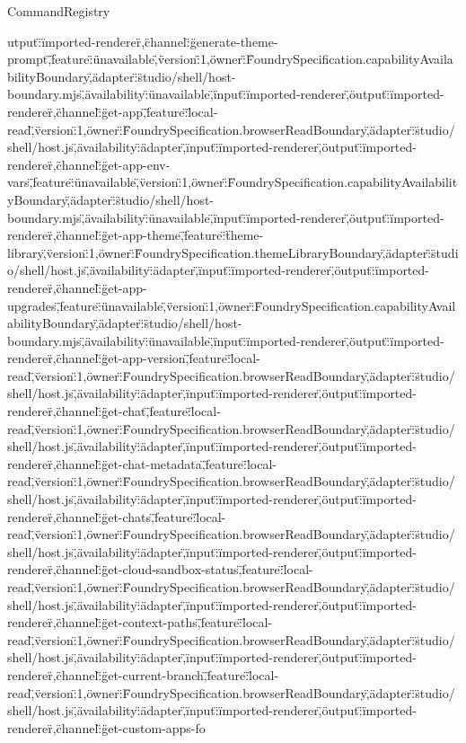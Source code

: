 \begin{lexlean}{CommandRegistry}
\begin{semanticmodule}
{utput\":\"imported-renderer\"},{\"channel\":\"generate-theme-prompt\",\"feature\":\"unavailable\",\"version\":1,\"owner\":\"FoundrySpecification.capabilityAvailabilityBoundary\",\"adapter\":\"studio/shell/host-boundary.mjs\",\"availability\":\"unavailable\",\"input\":\"imported-renderer\",\"output\":\"imported-renderer\"},{\"channel\":\"get-app\",\"feature\":\"local-read\",\"version\":1,\"owner\":\"FoundrySpecification.browserReadBoundary\",\"adapter\":\"studio/shell/host.js\",\"availability\":\"adapter\",\"input\":\"imported-renderer\",\"output\":\"imported-renderer\"},{\"channel\":\"get-app-env-vars\",\"feature\":\"unavailable\",\"version\":1,\"owner\":\"FoundrySpecification.capabilityAvailabilityBoundary\",\"adapter\":\"studio/shell/host-boundary.mjs\",\"availability\":\"unavailable\",\"input\":\"imported-renderer\",\"output\":\"imported-renderer\"},{\"channel\":\"get-app-theme\",\"feature\":\"theme-library\",\"version\":1,\"owner\":\"FoundrySpecification.themeLibraryBoundary\",\"adapter\":\"studio/shell/host.js\",\"availability\":\"adapter\",\"input\":\"imported-renderer\",\"output\":\"imported-renderer\"},{\"channel\":\"get-app-upgrades\",\"feature\":\"unavailable\",\"version\":1,\"owner\":\"FoundrySpecification.capabilityAvailabilityBoundary\",\"adapter\":\"studio/shell/host-boundary.mjs\",\"availability\":\"unavailable\",\"input\":\"imported-renderer\",\"output\":\"imported-renderer\"},{\"channel\":\"get-app-version\",\"feature\":\"local-read\",\"version\":1,\"owner\":\"FoundrySpecification.browserReadBoundary\",\"adapter\":\"studio/shell/host.js\",\"availability\":\"adapter\",\"input\":\"imported-renderer\",\"output\":\"imported-renderer\"},{\"channel\":\"get-chat\",\"feature\":\"local-read\",\"version\":1,\"owner\":\"FoundrySpecification.browserReadBoundary\",\"adapter\":\"studio/shell/host.js\",\"availability\":\"adapter\",\"input\":\"imported-renderer\",\"output\":\"imported-renderer\"},{\"channel\":\"get-chat-metadata\",\"feature\":\"local-read\",\"version\":1,\"owner\":\"FoundrySpecification.browserReadBoundary\",\"adapter\":\"studio/shell/host.js\",\"availability\":\"adapter\",\"input\":\"imported-renderer\",\"output\":\"imported-renderer\"},{\"channel\":\"get-chats\",\"feature\":\"local-read\",\"version\":1,\"owner\":\"FoundrySpecification.browserReadBoundary\",\"adapter\":\"studio/shell/host.js\",\"availability\":\"adapter\",\"input\":\"imported-renderer\",\"output\":\"imported-renderer\"},{\"channel\":\"get-cloud-sandbox-status\",\"feature\":\"local-read\",\"version\":1,\"owner\":\"FoundrySpecification.browserReadBoundary\",\"adapter\":\"studio/shell/host.js\",\"availability\":\"adapter\",\"input\":\"imported-renderer\",\"output\":\"imported-renderer\"},{\"channel\":\"get-context-paths\",\"feature\":\"local-read\",\"version\":1,\"owner\":\"FoundrySpecification.browserReadBoundary\",\"adapter\":\"studio/shell/host.js\",\"availability\":\"adapter\",\"input\":\"imported-renderer\",\"output\":\"imported-renderer\"},{\"channel\":\"get-current-branch\",\"feature\":\"local-read\",\"version\":1,\"owner\":\"FoundrySpecification.browserReadBoundary\",\"adapter\":\"studio/shell/host.js\",\"availability\":\"adapter\",\"input\":\"imported-renderer\",\"output\":\"imported-renderer\"},{\"channel\":\"get-custom-apps-fo}
\end{semanticmodule}
\end{lexlean}
